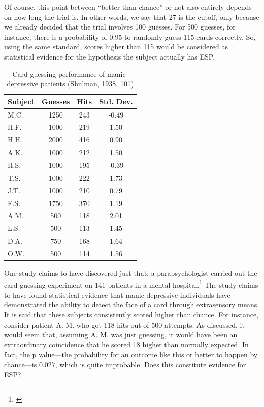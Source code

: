Of course, this point between ``better than chance'' or not also entirely depends on how long the trial
is. In other words, we say that 27 is the cutoff, only because we
already decided that the trial involves 100 guesses. For 500 guesses,
for instance, there is a probability of 0.95 to randomly guess 115 cards
correctly. So, using the same standard, scores higher than 115 would be
considered as statistical evidence for the hypothesis the subject
actually has ESP.

\begin{table}[]
\centering
\begin{tabular}{l|c|c|c}
 Subject& Guesses &Hits  & Std. Dev. \\\hline
 M.C.& 1250 & 243 &  -0.49\\
H.F. &1000  & 219 & 1.50 \\
H.H. & 2000 & 416 & 0.90 \\
A.K. & 1000 & 212 & 1.50 \\
 H.S.& 1000 & 195 & -0.39 \\
 T.S. & 1000 & 222 & 1.73 \\
 J.T.& 1000 & 210 & 0.79 \\
 E.S.& 1750 & 370 & 1.19 \\
 A.M.& 500 & 118 & 2.01 \\
 L.S.& 500 & 113 & 1.45 \\
 D.A.& 750 & 168 &  1.64\\
 O.W.& 500 & 114 &  1.56
\end{tabular}
\caption{Card-guessing performance of manic-depressive patients (Shulman, 1938, 101)}
\label{psychotable}
\end{table}

One study claims to have discovered just that: a parapsychologist
carried out the card guessing experiment on 141 patients in a mental
hospital.\footnote{\cite{psyesp}} The study claims to have found statistical evidence that
manic-depressive individuals have demonstrated the ability to detect the
face of a card through extrasensory means. It is said that these
subjects consistently scored higher than chance. For instance, consider
patient A. M. who got 118 hits out of 500 attempts. As discussed, it
would seem that, assuming A. M. was just guessing, it would have been an
extraordinary coincidence that he scored 18 higher than normally
expected. In fact, the p value---the probability for an outcome like this or
better to happen by chance---is \(0.027\), which is quite
improbable. Does this constitute evidence for ESP?

